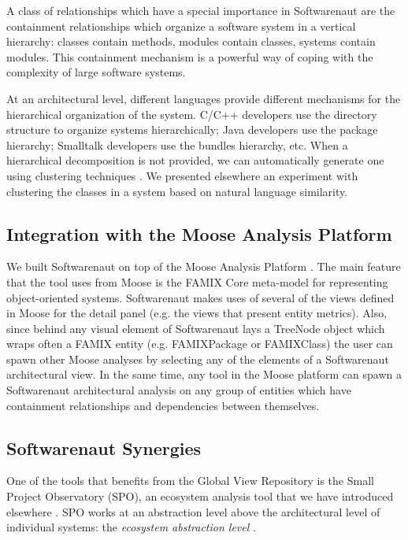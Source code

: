 \documentclass[preprint,12pt]{elsarticle}
\begin{document}
A class of relationships which have a special importance in Softwarenaut are the containment relationships which organize a software system in a vertical hierarchy: classes contain methods, modules contain classes, systems contain modules. This containment mechanism is a powerful way of coping with the complexity of large software systems.

At an architectural level, different languages provide different mechanisms for the hierarchical organization of the system. C/C++ developers use the directory structure to organize systems hierarchically; Java developers use the package hierarchy; Smalltalk developers use the bundles hierarchy, etc. 
When a hierarchical decomposition is not provided, we can automatically generate one using clustering techniques \cite{koschke-thesis}. We presented elsewhere an experiment with clustering the classes in a system based on natural language similarity\cite{Lung05a}.

\subsection {Integration with the Moose Analysis Platform}


We built Softwarenaut on top of the Moose Analysis Platform \cite{nier-story}. The main feature that the tool uses from Moose is the FAMIX Core meta-model for representing object-oriented systems. Softwarenaut makes uses of several of the views defined in Moose for the detail panel (e.g. the views that present entity metrics). Also, since behind any visual element of Softwarenaut lays a TreeNode object which wraps often a FAMIX entity (e.g. FAMIXPackage or FAMIXClass) the user can spawn other Moose analyses by selecting any of the elements of a Softwarenaut architectural view. In the same time, any tool in the Moose platform can spawn a Softwarenaut architectural analysis on any group of entities which have containment relationships and dependencies between themselves.

\subsection {Softwarenaut Synergies}

One of the tools that benefits from the Global View Repository is the Small Project Observatory (SPO), an ecosystem analysis tool that we have introduced elsewhere \cite{lungu-est}. SPO works at an abstraction level above the architectural level of individual systems: the {\em ecosystem abstraction level} \cite{lungu-thesis}. 
\end{document}
